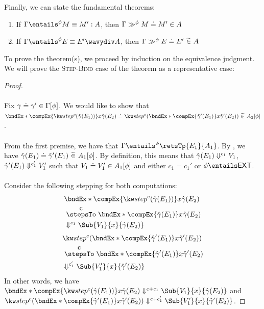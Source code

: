 \documentclass[letterpaper]{article}
\newcommand{\EXT}{\textsf{EXT}}
\newcommand{\gyat}{\hat{\gamma}}
\begin{document}
Finally, we can state the fundamental theorems:
\begin{theorem}\label{thm:ftlr}\phantom{nextline}
    \begin{enumerate}
        \item If $\exEquivPhase{\Gamma}{\phi}{M}{M'}{A}$, then $\Gamma \gg^\phi M\mathrel{\doteq}M' \in A$
        \item If $\compEquivPhase{\Gamma}{\phi}{E}{E'}{A}$, then $\Gamma \gg^\phi E\mathrel{\doteq}E'\ \widetilde{\in}\ A$
    \end{enumerate}
\end{theorem}

To prove the theorem(s), we proceed by induction on the equivalence judgment. We will prove the \textsc{Step-Bind} case of the theorem as a representative case:
\begin{proof}\phantom{nextline}\\\\
    Fix $\gamma\mathrel{\doteq}\gamma' \in \Gamma [\phi]$.
    We would like to show that\\ $\compEqOfPhase{\bndEx*{\compEx{\stepEx{c}{\gyat(E_1)}}}{x}{\gyat(E_2)}}{\stepEx{c}{\bndEx*{\compEx{\gyat'(E_1)}}{x}{\gyat'(E_2)}}}{A_2}{\phi}$.\\\\
    From the first premise, we have that $\Gamma \entailsPhase{\phi} \retsTp{E_1}{A_1}$. By ,
    we have $\compEqOfPhase{\gyat(E_1)}{\gyat'(E_1)}{A_1}{\phi}$. By definition, this means that $\gyat(E_1) \evalsToC{c_1} V_1$, $\gyat'(E_1) \evalsToC{c_1'} V_1'$ such that $V_1\mathrel{\doteq}V_1' \in A_1 [\phi]$
    and either $c_1 = c_1'$ or $\phi \entails \EXT$.\\\\
    Consider the following stepping for both computations:
    \begin{align*}
        &\bndEx*{\compEx{\stepEx{c}{\gyat(E_1)}}}{x}{\gyat(E_2)}\\
        &\stepsToC{c} \bndEx*{\compEx{\gyat(E_1)}}{x}{\gyat(E_2)}\\
        &\evalsToC{c_1} \Sub{V_1}{x}{\gyat(E_2)}
    \end{align*}
    \begin{align*}
        &\stepEx{c}{\bndEx*{\compEx{\gyat'(E_1)}}{x}{\gyat'(E_2)}}\\
        &\stepsToC{c} \bndEx*{\compEx{\gyat'(E_1)}}{x}{\gyat'(E_2)}\\
        &\evalsToC{c_1'} \Sub{V_1'}{x}{\gyat'(E_2)}
    \end{align*}
    In other words, we have $\bndEx*{\compEx{\stepEx{c}{\gyat(E_1)}}}{x}{\gyat(E_2)} \evalsToC{c+c_1} \Sub{V_1}{x}{\gyat(E_2)}$ and $\stepEx{c}{\bndEx*{\compEx{\gyat'(E_1)}}{x}{\gyat'(E_2)}} \evalsToC{c+c_1'} \Sub{V_1'}{x}{\gyat'(E_2)}$.


\end{proof}
\end{document}

